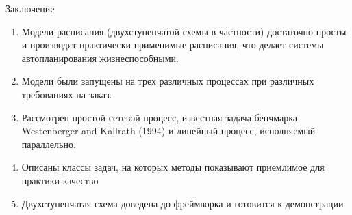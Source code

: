 \documentclass{beamer}
\begin{document}
\begin{frame}{Заключение}
	\begin{enumerate}
	\item Модели расписания (двухступенчатой схемы в частности) достаточно просты и производят практически применимые расписания, что делает системы автопланирования жизнеспособными.
	\item Модели были запущены на трех различных процессах при различных требованиях на заказ.
	\item Рассмотрен простой сетевой процесс, известная задача бенчмарка Westenberger and Kallrath (1994) и линейный процесс, исполняемый параллельно.
	\item Описаны классы задач, на которых методы показывают приемлимое для практики качество
	\item Двухступенчатая схема доведена до фреймворка и готовится к демонстрации
	
\end{enumerate}

\end{frame}
\end{document}
